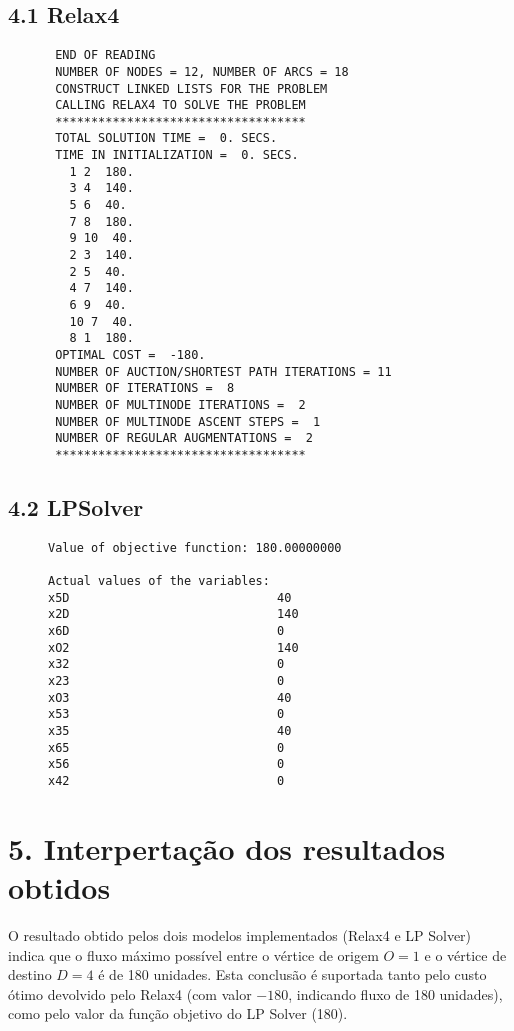 \documentclass[a4paper,12pt]{article}
\begin{document}
\subsection*{4.1 Relax4}
\begin{figure}[H]
\begin{lstlisting}
 END OF READING
 NUMBER OF NODES = 12, NUMBER OF ARCS = 18
 CONSTRUCT LINKED LISTS FOR THE PROBLEM
 CALLING RELAX4 TO SOLVE THE PROBLEM
 ***********************************
 TOTAL SOLUTION TIME =  0. SECS.
 TIME IN INITIALIZATION =  0. SECS.
   1 2  180.
   3 4  140.
   5 6  40.
   7 8  180.
   9 10  40.
   2 3  140.
   2 5  40.
   4 7  140.
   6 9  40.
   10 7  40.
   8 1  180.
 OPTIMAL COST =  -180.
 NUMBER OF AUCTION/SHORTEST PATH ITERATIONS = 11
 NUMBER OF ITERATIONS =  8
 NUMBER OF MULTINODE ITERATIONS =  2
 NUMBER OF MULTINODE ASCENT STEPS =  1
 NUMBER OF REGULAR AUGMENTATIONS =  2
 ***********************************
\end{lstlisting}
\end{figure}

\subsection*{4.2 LPSolver}
\begin{figure}[H]
\begin{lstlisting}
Value of objective function: 180.00000000

Actual values of the variables:
x5D                             40
x2D                             140
x6D                             0
xO2                             140
x32                             0
x23                             0
xO3                             40
x53                             0
x35                             40
x65                             0
x56                             0
x42                             0
\end{lstlisting}
\end{figure}

\section*{5. Interpertação dos resultados obtidos}
O resultado obtido pelos dois modelos implementados (Relax4 e LP Solver) indica que o fluxo máximo possível entre o vértice de origem $O = 1$ e o vértice de destino $D = 4$ é de 180 unidades. Esta conclusão é suportada tanto pelo custo ótimo devolvido pelo Relax4 (com valor $-180$, indicando fluxo de 180 unidades), como pelo valor da função objetivo do LP Solver (180).
\end{document}
